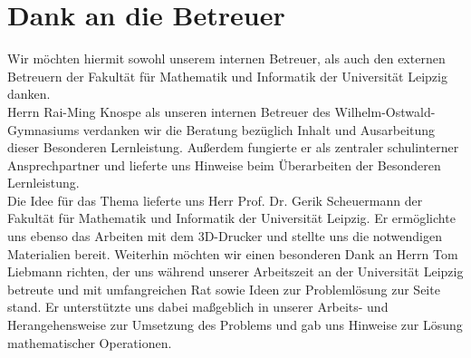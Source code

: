 \chapter*{Dank an die Betreuer}
Wir möchten hiermit sowohl unserem internen Betreuer, als auch den externen Betreuern der Fakultät für Mathematik und Informatik der Universität Leipzig danken. \\
Herrn Rai-Ming Knospe als unseren internen Betreuer des Wilhelm-Ostwald-Gymnasiums verdanken wir die Beratung bezüglich Inhalt und Ausarbeitung dieser Besonderen Lernleistung.
Außerdem fungierte er als zentraler schulinterner Ansprechpartner und lieferte uns Hinweise beim Überarbeiten der Besonderen Lernleistung. \\
Die Idee für das Thema lieferte uns Herr Prof. Dr. Gerik Scheuermann der Fakultät für Mathematik und Informatik der Universität Leipzig.
Er ermöglichte uns ebenso das Arbeiten mit dem 3D-Drucker und stellte uns die notwendigen Materialien bereit.
Weiterhin möchten wir einen besonderen Dank an Herrn Tom Liebmann richten, der uns während unserer Arbeitszeit an der Universität Leipzig betreute und mit umfangreichen Rat sowie Ideen zur Problemlösung zur Seite stand.
Er unterstützte uns dabei maßgeblich in unserer Arbeits- und Herangehensweise zur Umsetzung des Problems und gab uns Hinweise zur Lösung mathematischer Operationen.